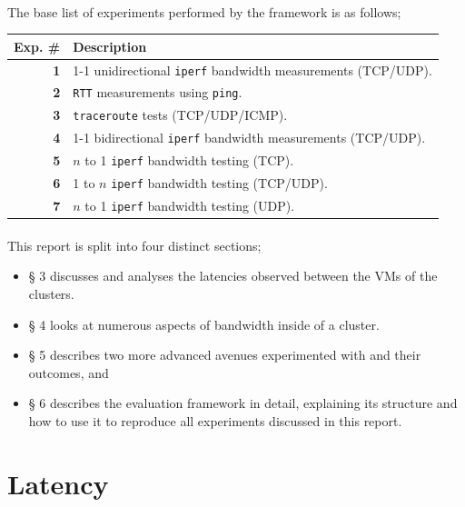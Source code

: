 \documentclass[a4paper,10pt]{article}
\begin{document}
\paragraph{} The base list of experiments performed by the framework is as follows;

\begin{center}
\begin{tabular}{ r|l } 
\textbf{Exp. \#} & Description \\
\hline
\textbf{1} & 1-1 unidirectional \texttt{iperf} bandwidth measurements (TCP/UDP). \\ 
\textbf{2} & \texttt{RTT} measurements using \texttt{ping}. \\ 
\textbf{3} & \texttt{traceroute} tests (TCP/UDP/ICMP). \\ 
\textbf{4} & 1-1 bidirectional \texttt{iperf} bandwidth measurements (TCP/UDP). \\ 
\textbf{5} & $n$ to 1 \texttt{iperf} bandwidth testing (TCP). \\ 
\textbf{6} & 1 to $n$ \texttt{iperf} bandwidth testing (TCP/UDP). \\ 
\textbf{7} & $n$ to 1 \texttt{iperf} bandwidth testing (UDP).\footnotemark \\
\end{tabular}
\end{center}

\paragraph{} This report is split into four distinct sections; 
\begin{itemize}
    \item § 3 discusses and analyses the latencies observed between the VMs of the clusters.
    \item § 4 looks at numerous aspects of bandwidth inside of a cluster.
    \item § 5 describes two more advanced avenues experimented with and their outcomes, and
    \item § 6 describes the evaluation framework in detail, explaining its structure and how to use it to reproduce all experiments discussed in this report.
\end{itemize}

\newpage
\section{Latency}
\label{sec:latency}
\end{document}
